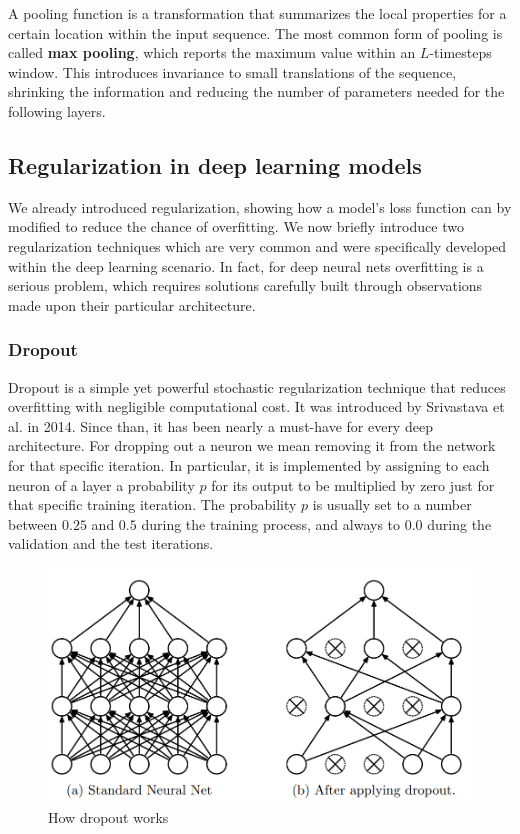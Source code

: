 \documentclass[a4paper, twoside]{article}
\begin{document}
        A pooling function is a transformation that summarizes the local properties for a certain location within the input sequence. The most common form of pooling is called \textbf{max pooling}, which reports the maximum value within an $L$-timesteps window. This introduces invariance to small translations of the sequence, shrinking the information and reducing the number of parameters needed for the following layers.


    \subsection{Regularization in deep learning models}

        We already introduced regularization, showing how a model's loss function can by modified to reduce the chance of overfitting. We now briefly introduce two regularization techniques which are very common and were specifically developed within the deep learning scenario. In fact, for deep neural nets overfitting is a serious problem, which requires solutions carefully built through observations made upon their particular architecture.

        \subsubsection{Dropout}
        Dropout is a simple yet powerful stochastic regularization technique that reduces overfitting with negligible computational cost. It was introduced by Srivastava et al. in 2014. Since than, it has been nearly a must-have for every deep architecture.
        For dropping out a neuron we mean removing it from the network for that specific iteration. In particular, it is implemented by assigning to each neuron of a layer a probability $p$ for its output to be multiplied by zero just for that specific training iteration. The probability $p$ is usually set to a number between $0.25$ and $0.5$ during the training process, and always to $0.0$ during the validation and the test iterations.

        \begin{figure}[H]
            \centering
            \includegraphics[width=0.6\linewidth]{dropout.png}
            \caption{How dropout works}
        \end{figure}
\end{document}
